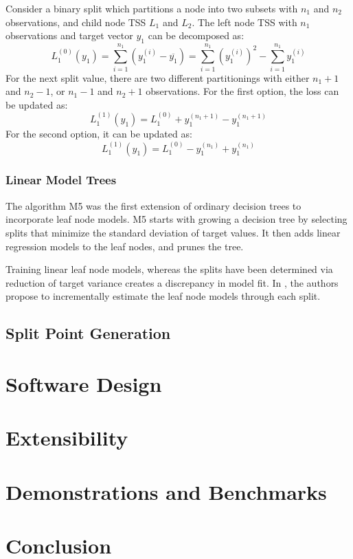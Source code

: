 \documentclass[a4paper, 11pt]{article}
\begin{document}
\par
Consider a binary split which partitions a node into two subsets with $n_1$ and $n_2$ observations, and child node TSS $L_1$ and $L_2$. The left node TSS with $n_1$ observations and target vector $y_1$ can be decomposed as:
$$
L_1^{(0)}(y_1) = \sum_{i = 1}^{n_1} \left(y_1^{(i)} - \overline{y_1}\right) = \sum_{i = 1}^{n_1} \left(y_1^{(i)}\right)^2 - \sum_{i = 1}^{n_1} y_1^{(i)} 
$$
For the next split value, there are two different partitionings with either $n_1 + 1$ and $n_2 - 1$, or $n_1 - 1$ and $n_2 + 1$ observations. For the first option, the loss can be updated as:
$$
L_1^{(1)}(y_1) = L_1^{(0)} + y_{1}^{(n_1 + 1)} - y_{1}^{(n_1 + 1)}
$$
For the second option, it can be updated as:
$$
L_1^{(1)}(y_1) = L_1^{(0)} - y_{1}^{(n_1)} + y_{1}^{(n_1)}
$$


\subsubsection{Linear Model Trees}

The algorithm M5 \cite{quinlan_model_tree} was the first extension of ordinary decision trees to incorporate leaf node models.
M5 starts with growing a decision tree by selecting splits that minimize the standard deviation of target values. It then adds linear regression models to the leaf nodes, and prunes the tree. 
\par
Training linear leaf node models, whereas the splits have been determined via reduction of target variance creates a discrepancy in model fit. In \cite{potts_incremental_model_tree}, the authors propose to incrementally estimate the leaf node models through each split.

\subsection{Split Point Generation}





\section{Software Design}

\section{Extensibility}

\section{Demonstrations and Benchmarks}

\section{Conclusion}


\end{document}
